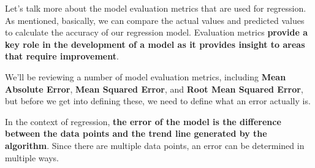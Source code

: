 	Let's talk more about the model evaluation metrics that are used for regression. As mentioned, basically, we can compare the actual values and predicted values to calculate the accuracy of our regression model. Evaluation metrics \textbf{provide a key role in the development of a model as it provides insight to areas that require improvement}. 
	
	We'll be reviewing a number of model evaluation metrics, including \textbf{Mean Absolute Error}, \textbf{Mean Squared Error}, and \textbf{Root Mean Squared Error}, but before we get into defining these, we need to define what an error actually is. 
	
	In the context of regression, \textbf{the error of the model is the difference between the data points and the trend line generated by the algorithm}. Since there are multiple data points, an error can be determined in multiple ways.

